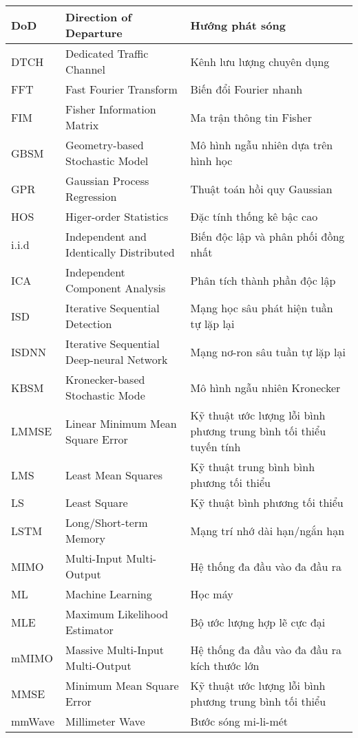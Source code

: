 {{\begin{longtable}{|p{2.35cm}|>{\raggedright}p{6.2cm}|p{5.75cm}|}
\hline
DoD & Direction of Departure & Hướng phát sóng \\ 
\hline
DTCH & Dedicated Traffic Channel & Kênh lưu lượng chuyên dụng \\ 
\hline
FFT & Fast Fourier Transform & Biến đổi Fourier nhanh \\ 
\hline
FIM & Fisher Information Matrix & Ma trận thông tin Fisher \\ 
\hline
GBSM & Geometry-based Stochastic Model & Mô hình ngẫu nhiên dựa trên hình học\\
\hline
GPR & Gaussian Process Regression & Thuật toán hồi quy Gaussian \\ 
\hline
HOS & Higer-order Statistics & Đặc tính thống kê bậc cao \\ 
\hline
i.i.d & Independent and Identically Distributed & Biến độc lập và phân phối đồng nhất \\ 
\hline
ICA & Independent Component Analysis & Phân tích thành phần độc lập \\ 
\hline
ISD & Iterative Sequential Detection & Mạng học sâu phát hiện tuần tự lặp lại \\ 
\hline
ISDNN & Iterative Sequential Deep-neural Network & Mạng nơ-ron sâu tuần tự lặp lại \\ 
\hline
KBSM & Kronecker-based Stochastic Mode & Mô hình ngẫu nhiên Kronecker\\
\hline
LMMSE & Linear Minimum Mean Square Error & Kỹ thuật ước lượng lỗi bình phương trung bình tối thiểu tuyến tính \\ 
\hline
LMS & Least Mean Squares & Kỹ thuật trung bình bình phương tối thiểu \\ 
\hline
LS & Least Square & Kỹ thuật bình phương tối thiểu \\ 
\hline
LSTM & Long/Short-term Memory & Mạng trí nhớ dài hạn/ngắn hạn \\ 
\hline
MIMO & Multi-Input Multi-Output & Hệ thống đa đầu vào đa đầu ra \\ 
\hline
ML & Machine Learning & Học máy \\ 
\hline
MLE & Maximum Likelihood Estimator & Bộ ước lượng hợp lẽ cực đại \\ 
\hline
mMIMO & Massive Multi-Input Multi-Output & Hệ thống đa đầu vào đa đầu ra kích thước lớn \\ 
\hline
MMSE & Minimum Mean Square Error & Kỹ thuật ước lượng lỗi bình phương trung bình tối thiểu \\ 
\hline
mmWave & Millimeter Wave & Bước sóng mi-li-mét \\ 

\end{longtable}}}
